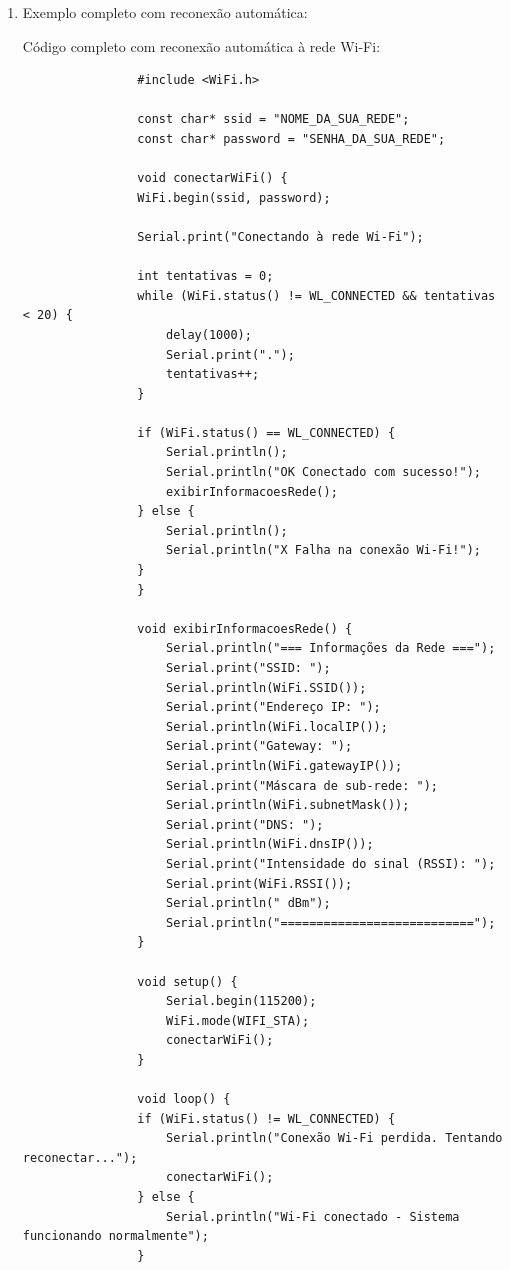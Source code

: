 \documentclass[a4paper]{article}
\begin{document}
\begin{answer}
\begin{enumerate}
            \item Exemplo completo com reconexão automática:

                Código completo com reconexão automática à rede Wi-Fi:
            \begin{verbatim}
                #include <WiFi.h>

                const char* ssid = "NOME_DA_SUA_REDE";
                const char* password = "SENHA_DA_SUA_REDE";

                void conectarWiFi() {
                WiFi.begin(ssid, password);

                Serial.print("Conectando à rede Wi-Fi");

                int tentativas = 0;
                while (WiFi.status() != WL_CONNECTED && tentativas < 20) {
                    delay(1000);
                    Serial.print(".");
                    tentativas++;
                }

                if (WiFi.status() == WL_CONNECTED) {
                    Serial.println();
                    Serial.println("OK Conectado com sucesso!");
                    exibirInformacoesRede();
                } else {
                    Serial.println();
                    Serial.println("X Falha na conexão Wi-Fi!");
                }
                }

                void exibirInformacoesRede() {
                    Serial.println("=== Informações da Rede ===");
                    Serial.print("SSID: ");
                    Serial.println(WiFi.SSID());
                    Serial.print("Endereço IP: ");
                    Serial.println(WiFi.localIP());
                    Serial.print("Gateway: ");
                    Serial.println(WiFi.gatewayIP());
                    Serial.print("Máscara de sub-rede: ");
                    Serial.println(WiFi.subnetMask());
                    Serial.print("DNS: ");
                    Serial.println(WiFi.dnsIP());
                    Serial.print("Intensidade do sinal (RSSI): ");
                    Serial.print(WiFi.RSSI());
                    Serial.println(" dBm");
                    Serial.println("===========================");
                }

                void setup() {
                    Serial.begin(115200);
                    WiFi.mode(WIFI_STA);
                    conectarWiFi();
                }

                void loop() {
                if (WiFi.status() != WL_CONNECTED) {
                    Serial.println("Conexão Wi-Fi perdida. Tentando reconectar...");
                    conectarWiFi();
                } else {
                    Serial.println("Wi-Fi conectado - Sistema funcionando normalmente");
                }


\end{verbatim}
\end{enumerate}
\end{answer}
\end{document}
